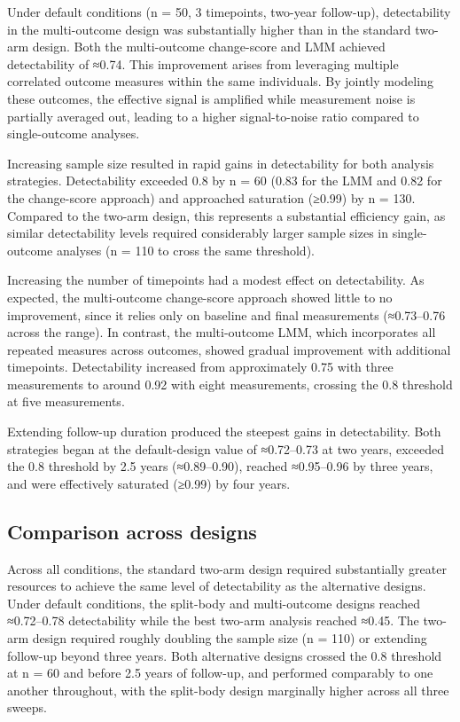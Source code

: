 \documentclass[twocolumn]{article} %
\begin{document}
Under default conditions (n = 50, 3 timepoints, two-year follow-up), detectability in the multi-outcome design was substantially higher than in the standard two-arm design. Both the multi-outcome change-score and LMM achieved detectability of ≈0.74. This improvement arises from leveraging multiple correlated outcome measures within the same individuals. By jointly modeling these outcomes, the effective signal is amplified while measurement noise is partially averaged out, leading to a higher signal-to-noise ratio compared to single-outcome analyses.

Increasing sample size resulted in rapid gains in detectability for both analysis strategies. Detectability exceeded 0.8 by n = 60 (0.83 for the LMM and 0.82 for the change-score approach) and approached saturation (≥0.99) by n = 130. Compared to the two-arm design, this represents a substantial efficiency gain, as similar detectability levels required considerably larger sample sizes in single-outcome analyses (n = 110 to cross the same threshold).

Increasing the number of timepoints had a modest effect on detectability. As expected, the multi-outcome change-score approach showed little to no improvement, since it relies only on baseline and final measurements (≈0.73–0.76 across the range). In contrast, the multi-outcome LMM, which incorporates all repeated measures across outcomes, showed gradual improvement with additional timepoints. Detectability increased from approximately 0.75 with three measurements to around 0.92 with eight measurements, crossing the 0.8 threshold at five measurements.

Extending follow-up duration produced the steepest gains in detectability. Both strategies began at the default-design value of ≈0.72–0.73 at two years, exceeded the 0.8 threshold by 2.5 years (≈0.89–0.90), reached ≈0.95–0.96 by three years, and were effectively saturated (≥0.99) by four years.

\subsection{Comparison across designs}

Across all conditions, the standard two-arm design required substantially greater resources to achieve the same level of detectability as the alternative designs. Under default conditions, the split-body and multi-outcome designs reached ≈0.72–0.78 detectability while the best two-arm analysis reached ≈0.45. The two-arm design required roughly doubling the sample size (n = 110) or extending follow-up beyond three years. Both alternative designs crossed the 0.8 threshold at n = 60 and before 2.5 years of follow-up, and performed comparably to one another throughout, with the split-body design marginally higher across all three sweeps.
\end{document}
